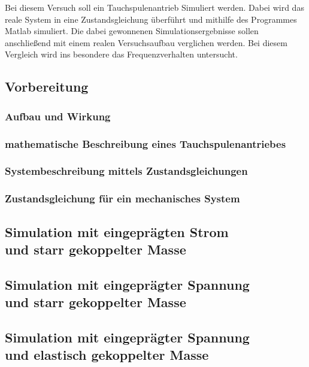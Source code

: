 \documentclass[12pt,a4paper,bibliography=totocnumbered,listof=totocnumbered]{scrartcl}
\begin{document}
Bei diesem Versuch soll ein Tauchspulenantrieb Simuliert werden. Dabei wird das reale System in eine Zustandsgleichung überführt und mithilfe des Programmes Matlab simuliert. Die dabei gewonnenen Simulationsergebnisse sollen anschließend mit einem realen Versuchsaufbau verglichen werden.
Bei diesem Vergleich wird ins besondere das Frequenzverhalten untersucht.

\subsection{Vorbereitung}



\subsubsection{Aufbau und Wirkung}

\subsubsection{mathematische Beschreibung eines Tauchspulenantriebes}

\subsubsection{Systembeschreibung mittels Zustandsgleichungen}

\subsubsection{Zustandsgleichung für ein mechanisches System}

\subsection{Simulation mit eingeprägten Strom \\ und starr gekoppelter Masse}

\subsection{Simulation mit eingeprägter Spannung \\ und starr gekoppelter Masse}

\subsection{Simulation mit eingeprägter Spannung \\ und elastisch gekoppelter Masse}
\end{document}
